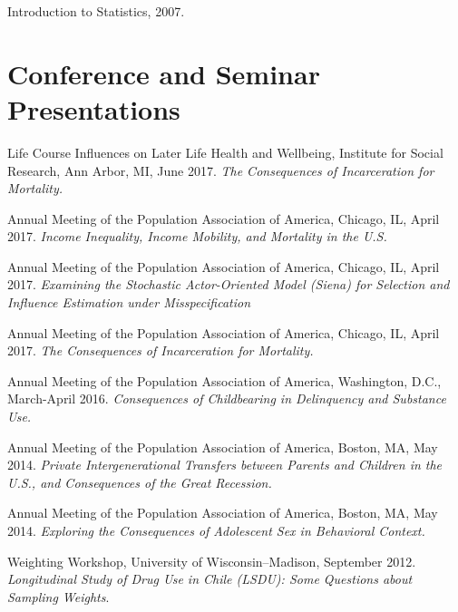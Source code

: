 \documentclass[10pt,letterpaper]{article}
\renewenvironment{itemize}{
  \begin{list}{}{
    \setlength{\leftmargin}{1.5em}
    \setlength{\itemsep}{0.25em}
    \setlength{\parskip}{0pt}
    \setlength{\parsep}{0.25em}
  }
}{
  \end{list}
}
\begin{document}
\begin{itemize}
\item Introduction to Statistics, 2007.
\end{itemize}


\section*{Conference and Seminar Presentations}

\begin{itemize}

\item Life Course Influences on Later Life Health and Wellbeing, Institute for Social Research, Ann Arbor, MI, June 2017. {\textit{The Consequences of Incarceration for Mortality.}}


\item  Annual Meeting of the Population Association of America, Chicago, IL, April 2017. {\textit{Income Inequality, Income Mobility, and Mortality in the U.S.}}

\item  Annual Meeting of the Population Association of America, Chicago, IL, April 2017. {\textit{Examining the Stochastic Actor-Oriented Model (Siena) for Selection and Influence Estimation under Misspecification}}

\item  Annual Meeting of the Population Association of America, Chicago, IL, April 2017. {\textit{The Consequences of Incarceration for Mortality.}}

\item  Annual Meeting of the Population Association of America, Washington, D.C., March-April 2016. {\textit{Consequences of Childbearing in Delinquency and Substance Use.}}

\item  Annual Meeting of the Population Association of America, Boston, MA, May 2014. {\textit{Private Intergenerational Transfers between Parents and Children in the U.S., and Consequences of the Great Recession.}}

\item  Annual Meeting of the Population Association of America, Boston, MA, May 2014. {\textit{Exploring the Consequences of Adolescent Sex in Behavioral Context.}}

\item Weighting Workshop, University of Wisconsin–Madison, September 2012. \textit{Longitudinal Study of Drug Use in Chile (LSDU): Some Questions about Sampling Weights}.


\end{itemize}
\end{document}
